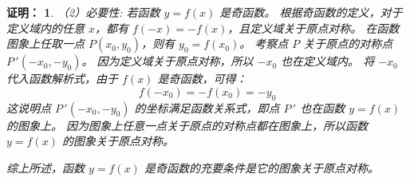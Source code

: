 \documentclass[aspectratio=169,13pt,t] {beamer}
\newtheorem*{prooft}{证明：}
\theoremstyle{definition}
\begin{document}
\begin{frame}
	\begin{prooft}	
	（2）必要性:
	若函数 $y=f(x)$ 是奇函数。
	根据奇函数的定义，对于定义域内的任意 $x$，都有 $f(-x) = -f(x)$，且定义域关于原点对称。
	在函数图象上任取一点 $P(x_0, y_0)$，则有 $y_0 = f(x_0)$。
	考察点 $P$ 关于原点的对称点 $P\,'(-x_0, -y_0)$。
	因为定义域关于原点对称，所以 $-x_0$ 也在定义域内。
	将 $-x_0$ 代入函数解析式，由于 $f(x)$ 是奇函数，可得：
	$$f(-x_0) = -f(x_0) = -y_0$$
	这说明点 $P\,'(-x_0, -y_0)$ 的坐标满足函数关系式，即点 $P\,'$ 也在函数 $y=f(x)$ 的图象上。
	因为图象上任意一点关于原点的对称点都在图象上，所以函数 $y=f(x)$ 的图象关于原点对称。
	
	
	综上所述，函数 $y=f(x)$ 是奇函数的充要条件是它的图象关于原点对称。
	\end{prooft}
\end{frame}
	
\end{document}
